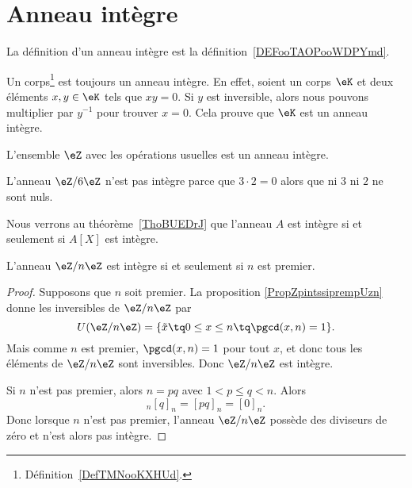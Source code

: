 \section{Anneau intègre}
\label{SECAnneauxIntegres}

La définition d'un anneau intègre est la définition~\ref{DEFooTAOPooWDPYmd}.

\begin{example}     \label{EXooMXNTooZaRPPi}
    Un corps\footnote{Définition~\ref{DefTMNooKXHUd}.} est toujours un anneau intègre. En effet, soient un corps \( \eK\) et deux éléments \( x,y\in \eK\) tels que \( xy=0\). Si \( y\) est inversible, alors nous pouvons multiplier par \( y^{-1}\) pour trouver \( x=0\). Cela prouve que \( \eK\) est un anneau intègre.
\end{example}

\begin{example}     \label{EXooLDXRooSxUAXs}
    L'ensemble \( \eZ\) avec les opérations usuelles est un anneau intègre.
\end{example}

\begin{example}
    L'anneau \( \eZ/6\eZ\) n'est pas intègre parce que \( 3\cdot 2=0\) alors que ni \( 3\) ni \( 2\) ne sont nuls.
\end{example}

Nous verrons au théorème~\ref{ThoBUEDrJ} que l'anneau \( A\) est intègre si et seulement si \( A[X]\) est intègre.

\begin{corollary}   \label{CorZnInternprem}
    L'anneau \( \eZ/n\eZ\) est intègre si et seulement si \( n\) est premier.
\end{corollary}

\begin{proof}
    Supposons que \( n\) soit premier. La proposition \ref{PropZpintssiprempUzn} donne les inversibles de \( \eZ/n\eZ\) par
    \begin{equation}
        U(\eZ/n\eZ)=\{ \tilde x\tq 0\leq x\leq n\tq\pgcd(x,n)=1 \}.
    \end{equation}
    Mais comme \( n\) est premier, \( \pgcd(x,n)=1\) pour tout \( x\), et donc tous les éléments de \( \eZ/n\eZ\) sont inversibles. Donc \( \eZ/n\eZ\) est intègre.

    Si \( n\) n'est pas premier, alors \( n=pq\) avec \( 1<p\leq q<n\). Alors
    \begin{equation}
        [p]_n[q]_n=[pq]_n=[0]_n.
    \end{equation}
    Donc lorsque \( n\) n'est pas premier,  l'anneau \( \eZ/n\eZ\) possède des diviseurs de zéro et n'est alors pas intègre.
\end{proof}

